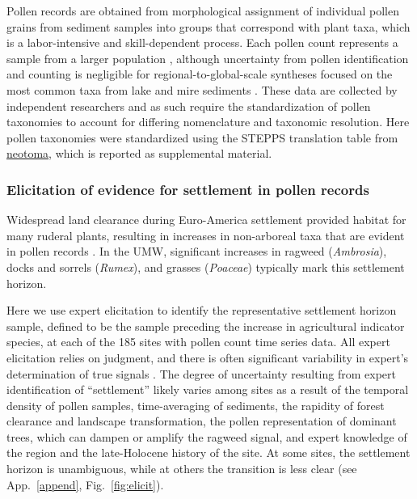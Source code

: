 \documentclass[12pt]{article}
\begin{document}
Pollen records are obtained from morphological assignment of
individual pollen grains from sediment samples into groups that
correspond with plant taxa, which is a labor-intensive and
skill-dependent process. Each pollen count represents a sample from a
larger population \citep{maher2012assessment, maher1981statistics},
although uncertainty from pollen identification and counting is
negligible for regional-to-global-scale syntheses focused on the most
common taxa from lake and mire sediments \citep{webb1978sensing,
  webb1978mapped}. These data are collected by independent researchers
and as such require the standardization of pollen taxonomies to
account for differing nomenclature and taxonomic resolution. Here
pollen taxonomies were standardized using the STEPPS translation table
from \url{neotoma}, which is reported as supplemental material.

\subsubsection{Elicitation of evidence for settlement in pollen
  records}

Widespread land clearance during Euro-America settlement provided
habitat for many ruderal plants, resulting in increases in
non-arboreal taxa that are evident in pollen records
\citep{mcandrews1988human}. In the UMW, significant
increases in ragweed (\textit{Ambrosia}), docks and sorrels
(\textit{Rumex}), and grasses (\textit{Poaceae}) typically mark this
settlement horizon.

Here we use expert elicitation to identify the representative
settlement horizon sample, defined to be the sample preceding the
increase in agricultural indicator species, at each of the 185 sites
with pollen count time series data. All expert elicitation relies on
judgment, and there is often significant variability in expert's
determination of true signals \citep{bond2007you, bond2012makes}. The
degree of uncertainty resulting from expert identification of
``settlement'' likely varies among sites as a result of the temporal
density of pollen samples, time-averaging of sediments, the rapidity
of forest clearance and landscape transformation, the pollen
representation of dominant trees, which can dampen or amplify the
ragweed signal, and expert knowledge of the region and the
late-Holocene history of the site. At some sites, the settlement
horizon is unambiguous, while at others the transition is less clear
(see App.~\ref{append}, Fig.~\ref{fig:elicit}).
\end{document}

